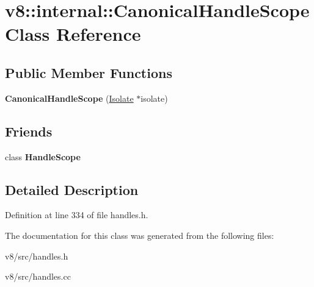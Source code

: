 \hypertarget{classv8_1_1internal_1_1CanonicalHandleScope}{}\section{v8\+:\+:internal\+:\+:Canonical\+Handle\+Scope Class Reference}
\label{classv8_1_1internal_1_1CanonicalHandleScope}
\subsection*{Public Member Functions}
\begin{DoxyCompactItemize}
\item 
\mbox{\label{classv8_1_1internal_1_1CanonicalHandleScope_a0eb34a265370c313f792014ff5496c19}} 
{\bfseries Canonical\+Handle\+Scope} (\mbox{\hyperlink{classv8_1_1internal_1_1Isolate}{Isolate}} $\ast$isolate)
\end{DoxyCompactItemize}
\subsection*{Friends}
\begin{DoxyCompactItemize}
\item 
\mbox{\label{classv8_1_1internal_1_1CanonicalHandleScope_a5f127e488db492b05c8542cec0b880b7}} 
class {\bfseries Handle\+Scope}
\end{DoxyCompactItemize}


\subsection{Detailed Description}


Definition at line 334 of file handles.\+h.



The documentation for this class was generated from the following files\+:\begin{DoxyCompactItemize}
\item 
v8/src/handles.\+h\item 
v8/src/handles.\+cc\end{DoxyCompactItemize}
